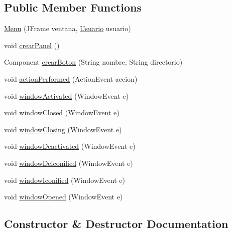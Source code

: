 \subsection*{Public Member Functions}
\begin{DoxyCompactItemize}
\item 
\mbox{\hyperlink{classmenu__seleccion_1_1_menu_ab5f3ec49570a241ab7b6541dce6edba1}{Menu}} (J\+Frame ventana, \mbox{\hyperlink{classclases_1_1_usuario}{Usuario}} usuario)
\item 
void \mbox{\hyperlink{classmenu__seleccion_1_1_menu_a0c343de6099f0b63a85771456a59782f}{crear\+Panel}} ()
\item 
Component \mbox{\hyperlink{classmenu__seleccion_1_1_menu_ab90e5b1e7893fc1321b9a3394d3d9d6c}{crear\+Boton}} (String nombre, String directorio)
\item 
void \mbox{\hyperlink{classmenu__seleccion_1_1_menu_a7a403c4df99f7687b71b83b698dbb678}{action\+Performed}} (Action\+Event accion)
\item 
void \mbox{\hyperlink{classmenu__seleccion_1_1_menu_ad439936756fbce3bc0128bc33b3f80b3}{window\+Activated}} (Window\+Event e)
\item 
void \mbox{\hyperlink{classmenu__seleccion_1_1_menu_a5668e89455ec8472f264026e307637d4}{window\+Closed}} (Window\+Event e)
\item 
void \mbox{\hyperlink{classmenu__seleccion_1_1_menu_aa0e102a13ab297de1bf364adaae917cb}{window\+Closing}} (Window\+Event e)
\item 
void \mbox{\hyperlink{classmenu__seleccion_1_1_menu_acfd4d13c72c923e22bf9e00261e3862a}{window\+Deactivated}} (Window\+Event e)
\item 
void \mbox{\hyperlink{classmenu__seleccion_1_1_menu_adf87abfaa566cf6a90ce3a22de792921}{window\+Deiconified}} (Window\+Event e)
\item 
void \mbox{\hyperlink{classmenu__seleccion_1_1_menu_a4064e0ae07a8ae87a8e6b146fb50fc94}{window\+Iconified}} (Window\+Event e)
\item 
void \mbox{\hyperlink{classmenu__seleccion_1_1_menu_ac219477734bee53f1041140051a11ebb}{window\+Opened}} (Window\+Event e)
\end{DoxyCompactItemize}


\subsection{Constructor \& Destructor Documentation}
\mbox{\label{classmenu__seleccion_1_1_menu_ab5f3ec49570a241ab7b6541dce6edba1}} 
